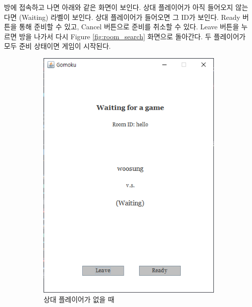 \documentclass[a4paper, 10pt]{article}
\begin{document}
방에 접속하고 나면 아래와 같은 화면이 보인다. 상대 플레이어가 아직 들어오지
않는다면 (Waiting) 라벨이 보인다. 상대 플레이어가 들어오면 그 ID가 보인다.
Ready 버튼을 통해 준비할 수 있고, Cancel 버튼으로 준비를 취소할 수 있다.
Leave 버튼을 누르면 방을 나가서 다시 Figure \ref{fig:room_search} 화면으로
돌아간다. 두 플레이어가 모두 준비 상태이면 게임이 시작된다.
\begin{figure}[h]
  \centering
  \begin{subfigure}{.3\textwidth}
    \centering
    \includegraphics[width=.9\linewidth]{resource/waiting}
    \caption{상대 플레이어가 없을 때}
    \label{fig:waiting}
  \end{subfigure}
  \begin{subfigure}{.3\textwidth}
    \centering

\end{subfigure}
\end{figure}
\end{document}
